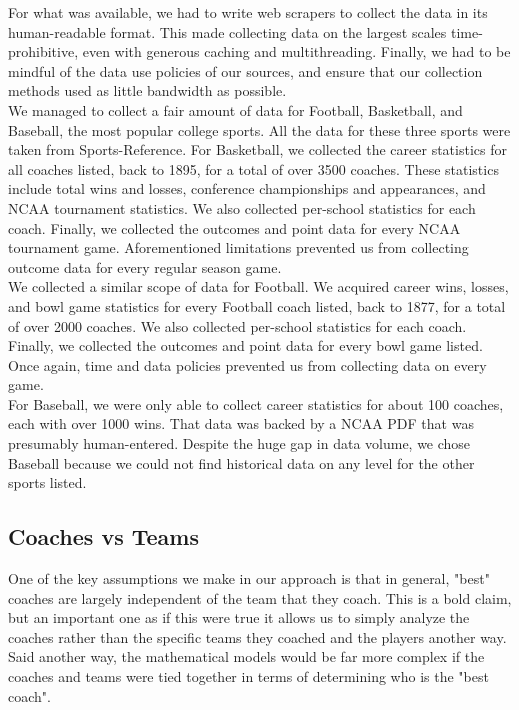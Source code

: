 \documentclass[titlepage,11pt]{article}
\begin{document}
\noindent For what was available, we had to write web scrapers to collect the data in its human-readable format. This made collecting data on the largest scales time-prohibitive, even with generous caching and multithreading. Finally, we had to be mindful of the data use policies of our sources, and ensure that our collection methods used as little bandwidth as possible.
\\

\noindent We managed to collect a fair amount of data for Football, Basketball, and Baseball, the most popular college sports. All the data for these three sports were taken from Sports-Reference. For Basketball, we collected the career statistics for all coaches listed, back to 1895, for a total of over 3500 coaches. These statistics include total wins and losses, conference championships and appearances, and NCAA tournament statistics. We also collected per-school statistics for each coach. Finally, we collected the outcomes and point data for every NCAA tournament game. Aforementioned limitations prevented us from collecting outcome data for every regular season game. 
\\

\noindent We collected a similar scope of data for Football. We acquired career wins, losses, and bowl game statistics for every Football coach listed, back to 1877, for a total of over 2000 coaches. We also collected per-school statistics for each coach. Finally, we collected the outcomes and point data for every bowl game listed. Once again, time and data policies prevented us from collecting data on every game.
\\

\noindent For Baseball, we were only able to collect career statistics for about 100 coaches, each with over 1000 wins. That data was backed by a NCAA PDF that was presumably human-entered. Despite the huge gap in data volume, we chose Baseball because we could not find historical data on any level for the other sports listed.

\subsection{Coaches vs Teams}

One of the key assumptions we make in our approach is that in general, "best" coaches are largely independent of the team that they coach. This is a bold claim, but an important one as if this were true it allows us to simply analyze the coaches rather than the specific teams they coached and the players another way. Said another way, the mathematical models would be far more complex if the coaches and teams were tied together in terms of determining who is the "best coach". 
\\
\end{document}
